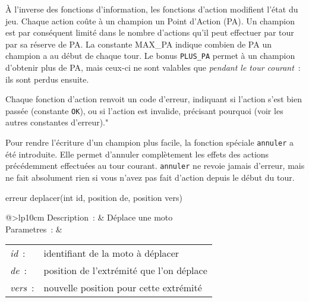 À l’inverse des fonctions d’information, les fonctions d’action modifient
l’état du jeu. Chaque action coûte à un champion un Point d’Action
(PA). Un champion est par conséquent limité dans le nombre d’actions qu’il
peut effectuer par tour par sa réserve de PA. La constante MAX\_PA indique
combien de PA un champion a au début de chaque tour. Le bonus
\texttt{PLUS\_PA} permet à un champion d’obtenir plus de PA, mais ceux-ci
ne sont valables que \emph{pendant le tour courant}~: ils sont perdus
ensuite.

Chaque fonction d’action renvoit un code d’erreur, indiquant si l’action
s’est bien passée (constante \texttt{OK}), ou si l’action est invalide,
précisant pourquoi (voir les autres constantes d’erreur)."

Pour rendre l’écriture d’un champion plus facile, la fonction spéciale
\texttt{annuler} a été introduite. Elle permet d’annuler complètement les
effets des actions précédemment effectuées au tour courant.
\texttt{annuler} ne revoie jamais d’erreur, mais ne fait absolument rien
si vous n’avez pas fait d’action depuis le début du tour.

\begin{minipage}{\linewidth}

\begin{lst-c++}
erreur deplacer(int id, position de, position vers)
\end{lst-c++}

\noindent
\begin{tabular}[t]{@{\extracolsep{0pt}}>{\bfseries}lp{10cm}}
Description~: & Déplace une moto \\


Parametres~: &
\begin{tabular}[t]{@{\extracolsep{0pt}}ll}
    
    
      
        \textsl{id}~: & identifiant de la moto à déplacer \\
      
    
      
        \textsl{de}~: & position de l'extrémité que l'on déplace \\
      
    
      
        \textsl{vers}~: & nouvelle position pour cette extrémité \\
      
    
  \end{tabular} \\






\end{tabular} \\[0.3cm]
\end{minipage}


